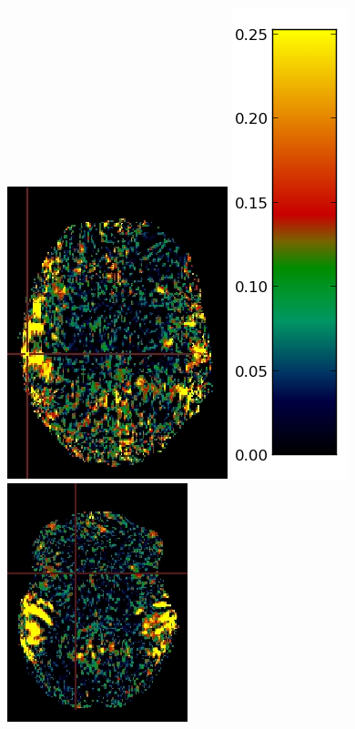 \documentclass[pdftex,ptm,12pt,a4paper]{report}
\theoremstyle{definition}
\begin{document}
\begin{figure}[h]
\begin{multicols}{4}
\includegraphics[scale=0.5]{graphics/slices/sub12.png}
\hfill
\centering
\includegraphics[scale=0.61]{graphics/slices/sub14.png}
\centering
\includegraphics[scale=0.61]{graphics/slices/sub15.png}

\end{multicols}
\end{figure}
\end{document}
